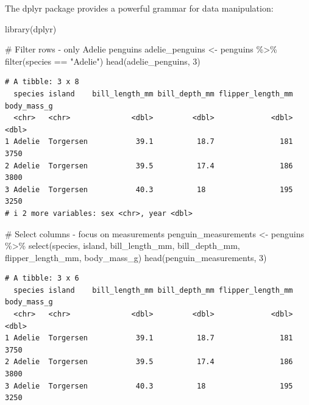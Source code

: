 \documentclass[
  letterpaper,
]{book}
\newenvironment{Shaded}{\begin{snugshade}}{\end{snugshade}}
\newcommand{\CommentTok}[1]{\textcolor[rgb]{0.37,0.37,0.37}{#1}}
\newcommand{\DecValTok}[1]{\textcolor[rgb]{0.68,0.00,0.00}{#1}}
\newcommand{\FunctionTok}[1]{\textcolor[rgb]{0.28,0.35,0.67}{#1}}
\newcommand{\NormalTok}[1]{\textcolor[rgb]{0.00,0.23,0.31}{#1}}
\newcommand{\OtherTok}[1]{\textcolor[rgb]{0.00,0.23,0.31}{#1}}
\newcommand{\SpecialCharTok}[1]{\textcolor[rgb]{0.37,0.37,0.37}{#1}}
\newcommand{\StringTok}[1]{\textcolor[rgb]{0.13,0.47,0.30}{#1}}
\begin{document}
The dplyr package provides a powerful grammar for data manipulation:

\begin{Shaded}
\begin{Highlighting}[]
\FunctionTok{library}\NormalTok{(dplyr)}

\CommentTok{\# Filter rows {-} only Adelie penguins}
\NormalTok{adelie\_penguins }\OtherTok{\textless{}{-}}\NormalTok{ penguins }\SpecialCharTok{\%\textgreater{}\%}
  \FunctionTok{filter}\NormalTok{(species }\SpecialCharTok{==} \StringTok{"Adelie"}\NormalTok{)}
\FunctionTok{head}\NormalTok{(adelie\_penguins, }\DecValTok{3}\NormalTok{)}
\end{Highlighting}
\end{Shaded}

\begin{verbatim}
# A tibble: 3 x 8
  species island    bill_length_mm bill_depth_mm flipper_length_mm body_mass_g
  <chr>   <chr>              <dbl>         <dbl>             <dbl>       <dbl>
1 Adelie  Torgersen           39.1          18.7               181        3750
2 Adelie  Torgersen           39.5          17.4               186        3800
3 Adelie  Torgersen           40.3          18                 195        3250
# i 2 more variables: sex <chr>, year <dbl>
\end{verbatim}

\begin{Shaded}
\begin{Highlighting}[]
\CommentTok{\# Select columns {-} focus on measurements}
\NormalTok{penguin\_measurements }\OtherTok{\textless{}{-}}\NormalTok{ penguins }\SpecialCharTok{\%\textgreater{}\%}
  \FunctionTok{select}\NormalTok{(species, island, bill\_length\_mm, bill\_depth\_mm, flipper\_length\_mm, body\_mass\_g)}
\FunctionTok{head}\NormalTok{(penguin\_measurements, }\DecValTok{3}\NormalTok{)}
\end{Highlighting}
\end{Shaded}

\begin{verbatim}
# A tibble: 3 x 6
  species island    bill_length_mm bill_depth_mm flipper_length_mm body_mass_g
  <chr>   <chr>              <dbl>         <dbl>             <dbl>       <dbl>
1 Adelie  Torgersen           39.1          18.7               181        3750
2 Adelie  Torgersen           39.5          17.4               186        3800
3 Adelie  Torgersen           40.3          18                 195        3250
\end{verbatim}
\end{document}
